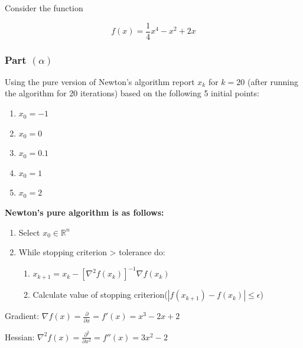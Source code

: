 \documentclass[
  letterpaper,
  DIV=11,
  numbers=noendperiod]{scrartcl}
\providecommand{\tightlist}{%
  \setlength{\itemsep}{0pt}\setlength{\parskip}{0pt}}\usepackage{longtable,booktabs,array}
\begin{document}
Consider the function

\[
f(x) = \frac{1}{4} x^4 - x^2 + 2x
\]

\subsubsection{\texorpdfstring{Part
\((\alpha)\)}{Part (\textbackslash alpha)}}\label{part-alpha}

Using the pure version of Newton's algorithm report \(x_k\) for
\(k = 20\) (after running the algorithm for 20 iterations) based on the
following 5 initial points:

\begin{enumerate}
\def\labelenumi{\arabic{enumi}.}
\tightlist
\item
  \(x_0 = −1\)
\item
  \(x_0 = 0\)
\item
  \(x_0 = 0.1\)
\item
  \(x_0 = 1\)
\item
  \(x_0 = 2\)
\end{enumerate}

\textbf{Newton's pure algorithm is as follows:}

\begin{enumerate}
\def\labelenumi{\arabic{enumi}.}
\tightlist
\item
  Select \(x_0 \in \mathbb{R}^n\)
\item
  While stopping criterion \textgreater{} tolerance do:

  \begin{enumerate}
  \def\labelenumii{\arabic{enumii}.}
  \tightlist
  \item
    \(x_{k+1} = x_k - [\nabla^2f(x_k)]^{-1} \nabla f(x_k)\)
  \item
    Calculate value of stopping
    criterion(\(|f(x_{k+1}) - f(x_k)| \leq \epsilon\))
  \end{enumerate}
\end{enumerate}

Gradient:
\(\nabla f(x) = \frac{\partial}{\partial x} = f'(x) = x^3 - 2x + 2\)

Hessian:
\(\nabla^2 f(x) = \frac{\partial^2}{\partial x^2} = f''(x) = 3x^2 - 2\)
\end{document}
